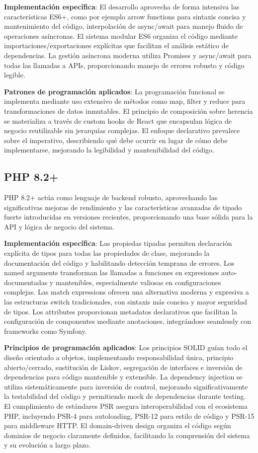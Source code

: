 \documentclass[12pt,a4paper,oneside]{report}
\begin{document}
\textbf{Implementación específica}: El desarrollo aprovecha de forma intensiva las características ES6+, como por ejemplo arrow functions para sintaxis concisa y mantenimiento del código, interpolación de async/await para manejo fluido de operaciones asíncronas. El sistema modular ES6 organiza el código mediante importaciones/exportaciones explícitas que facilitan el análisis estático de dependencias. La gestión asíncrona moderna utiliza Promises y async/await para todas las llamadas a APIs, proporcionando manejo de errores robusto y código legible.

\textbf{Patrones de programación aplicados}: La programación funcional se implementa mediante uso extensivo de métodos como map, filter y reduce para transformaciones de datos inmutables. El principio de composición sobre herencia se materializa a través de custom hooks de React que encapsulan lógica de negocio reutilizable sin jerarquías complejas. El enfoque declarativo prevalece sobre el imperativo, describiendo qué debe ocurrir en lugar de cómo debe implementarse, mejorando la legibilidad y mantenibilidad del código.

\subsection{PHP 8.2+}\label{php-8.2}

PHP 8.2+ actúa como lenguaje de backend robusto, aprovechando las significativas mejoras de rendimiento y las características avanzadas de tipado fuerte introducidas en versiones recientes, proporcionando una base sólida para la API y lógica de negocio del sistema.

\textbf{Implementación específica}: Las propiedas tipadas permiten declaración explícita de tipos para todas las propiedades de clase, mejorando la documentación del código y habilitando detección temprana de errores. Los named arguments transforman las llamadas a funciones en expresiones auto-documentadas y mantenibles, especialmente valiosas en configuraciones complejas. Las match expressions ofrecen una alternativa moderna y expresiva a las estructuras switch tradicionales, con sintaxis más concisa y mayor seguridad de tipos. Los attributes proporcionan metadatos declarativos que facilitan la configuración de componentes mediante anotaciones, integrándose seamlessly con frameworks como Symfony.

\textbf{Principios de programación aplicados}: Los principios SOLID guían todo el diseño orientado a objetos, implementando responsabilidad única, principio abierto/cerrado, sustitución de Liskov, segregación de interfaces e inversión de dependencias para código mantenible y extensible. La dependency injection se utiliza sistemáticamente para inversión de control, mejorando significativamente la testabilidad del código y permitiendo mock de dependencias durante testing. El cumplimiento de estándares PSR asegura interoperabilidad con el ecosistema PHP, incluyendo PSR-4 para autoloading, PSR-12 para estilo de código y PSR-15 para middleware HTTP. El domain-driven design organiza el código según dominios de negocio claramente definidos, facilitando la comprensión del sistema y su evolución a largo plazo.
\end{document}
